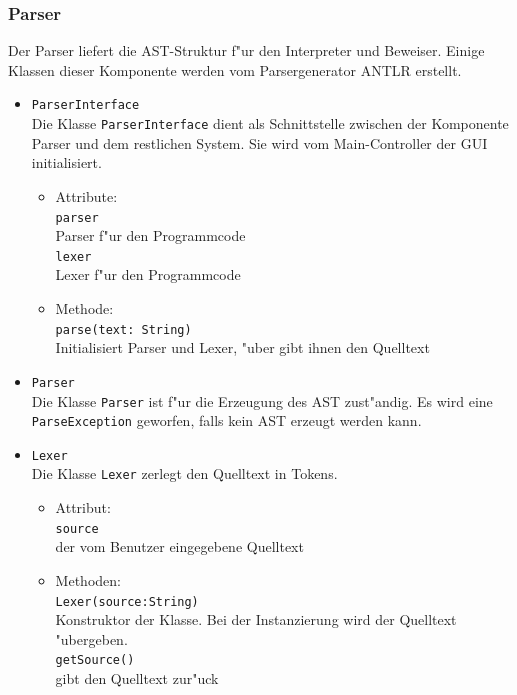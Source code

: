 \documentclass[10pt,a4paper,titlepage]{article}
\begin{document}
\subsubsection{Parser}

Der Parser liefert die AST-Struktur f"ur den Interpreter und Beweiser. Einige Klassen dieser Komponente werden vom Parsergenerator ANTLR erstellt. 
\begin{itemize}
\item \texttt{ParserInterface} \\
Die Klasse \texttt{ParserInterface} dient als Schnittstelle zwischen der Komponente Parser und dem restlichen System. Sie wird vom Main-Controller der GUI initialisiert. 
\begin{itemize}
\item Attribute: \\
\texttt{parser} \\
Parser f"ur den Programmcode \\
\texttt{lexer} \\
Lexer f"ur den Programmcode 
\item Methode: \\
\texttt{parse(text: String)} \\
Initialisiert Parser und Lexer, "uber gibt ihnen den Quelltext
\end{itemize}
\item \texttt{Parser} \\
Die Klasse \texttt{Parser} ist f"ur die Erzeugung des AST zust"andig. Es wird eine \texttt{ParseException} geworfen, falls kein AST erzeugt werden kann. 
\item \texttt{Lexer} \\
Die Klasse \texttt{Lexer} zerlegt den Quelltext in Tokens. 
\begin{itemize}
\item Attribut: \\
\texttt{source} \\
der vom Benutzer eingegebene Quelltext 
\item Methoden: \\
\texttt{Lexer(source:String)} \\
Konstruktor der Klasse. Bei der Instanzierung wird der Quelltext "ubergeben. \\
\texttt{getSource()} \\
gibt den Quelltext zur"uck \\
\end{itemize}
\end{itemize}
\end{document}
